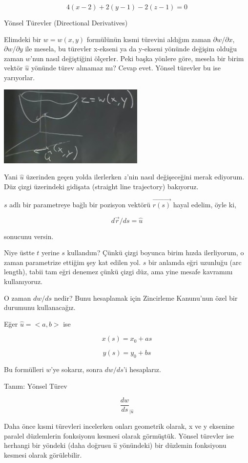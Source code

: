 \documentclass[12pt,fleqn]{article}\usepackage{../../common}
\begin{document}
$$ 4(x-2) + 2(y-1) - 2(z-1) = 0 $$

Yönsel Türevler (Directional Derivatives) 


Elimdeki bir $w = w(x,y)$ formülünün kısmi türevini aldığım zaman 
$\partial  w/\partial x$, $\partial w/\partial y$ ile mesela, bu türevler 
x-ekseni ya da y-ekseni yönünde değişim olduğu zaman $w$'nun nasıl
değiştiğini ölçerler. Peki başka yönlere göre, mesela bir birim 
vektör $\hat{u}$ yönünde türev alınamaz mı? Cevap evet. Yönsel 
türevler bu ise yarıyorlar.

\begin{center}
\includegraphics[height=4cm]{12_6.png}
\end{center}

Yani $\hat{u}$ üzerinden geçen yolda ilerlerken $z$'nin nasıl değişeceğini merak
ediyorum. Düz çizgi üzerindeki gidişata (straight line trajectory) bakıyoruz.

$s$ adlı bir parametreye bağlı bir pozisyon vektörü $\vec{r(s)}$ hayal
edelim, öyle ki,

$$ d\vec{r}/ds = \hat{u} $$

sonucunu versin.

Niye üstte $t$ yerine $s$ kullandım? Çünkü çizgi boyunca birim hızda
ilerliyorum, o zaman parametrize ettiğim şey kat edilen yol. $s$ bir anlamda
eğri uzunluğu (arc length), tabii tam eğri denemez çünkü çizgi düz, ama
yine mesafe kavramını kullanıyoruz.

O zaman $dw/ds$ nedir? Bunu hesaplamak için Zincirleme Kanunu'nun özel bir
durumunu kullanacağız.

Eğer $\hat{u} = <a,b>$ ise

$$ x(s) = x_0 + as $$

$$ y(s) = y_0 + bs $$

Bu formülleri $w$'ye sokarız, sonra $dw/ds$'i hesaplarız. 

Tanım: Yönsel Türev

$$ \frac{dw}{ds}_{|\hat{u}} $$

Daha önce kısmi türevleri incelerken onları geometrik olarak, x ve y
eksenine paralel düzlemlerin fonksiyonu kesmesi olarak görmüştük. Yönsel
türevler ise herhangi bir yöndeki (daha doğrusu $\hat{u}$ yönündeki) bir
düzlemin fonksiyonu kesmesi olarak görülebilir.
\end{document}
